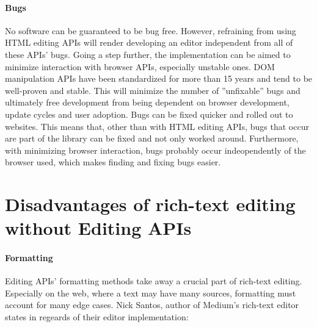 \paragraph{Bugs} No software can be guaranteed to be bug free. However, refraining from using HTML editing APIs will render developing an editor independent from all of these APIs' bugs. Going a step further, the implementation can be aimed to minimize interaction with browser APIs, especially unstable ones. DOM manipulation APIs have been standardized for more than 15 years and tend to be well-proven and stable. This will minimize the number of ''unfixable'' bugs and ultimately free development from being dependent on browser development, update cycles and user adoption. Bugs can be fixed quicker and rolled out to websites. This means that, other than with HTML editing APIs, bugs that occur are part of the library can be fixed and not only worked around. Furthermore, with minimizing browser interaction, bugs probably occur indeopendently of the browser used, which makes finding and fixing bugs easier.




\section{Disadvantages of rich-text editing without Editing APIs}

\paragraph{Formatting} Editing APIs' formatting methods take away a crucial part of rich-text editing. Especially on the web, where a text may have many sources, formatting must account for many edge cases. Nick Santos, author of Medium's rich-text editor states in regeards of their editor implementation:

